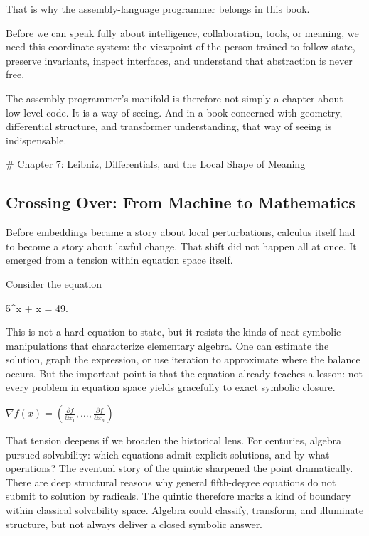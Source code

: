 \documentclass[
]{article}
\begin{document}
That is why the assembly-language programmer belongs in this book.

Before we can speak fully about intelligence, collaboration, tools, or
meaning, we need this coordinate system: the viewpoint of the person
trained to follow state, preserve invariants, inspect interfaces, and
understand that abstraction is never free.

The assembly programmer's manifold is therefore not simply a chapter
about low-level code. It is a way of seeing. And in a book concerned
with geometry, differential structure, and transformer understanding,
that way of seeing is indispensable.

\newpage
\vspace*{3cm}
\begin{center}
# Chapter 7: Leibniz, Differentials, and the Local Shape of Meaning
\end{center}

\hypertarget{crossing-over-from-machine-to-mathematics}{%
\subsection{Crossing Over: From Machine to
Mathematics}\label{crossing-over-from-machine-to-mathematics}}

Before embeddings became a story about local perturbations, calculus
itself had to become a story about lawful change. That shift did not
happen all at once. It emerged from a tension within equation space
itself.

Consider the equation

5\^{}x + x = 49.

This is not a hard equation to state, but it resists the kinds of neat
symbolic manipulations that characterize elementary algebra. One can
estimate the solution, graph the expression, or use iteration to
approximate where the balance occurs. But the important point is that
the equation already teaches a lesson: not every problem in equation
space yields gracefully to exact symbolic closure.

\(\nabla f(x)=\left(\frac{\partial f}{\partial x_1},\dots,\frac{\partial f}{\partial x_n}\right)\)

That tension deepens if we broaden the historical lens. For centuries,
algebra pursued solvability: which equations admit explicit solutions,
and by what operations? The eventual story of the quintic sharpened the
point dramatically. There are deep structural reasons why general
fifth-degree equations do not submit to solution by radicals. The
quintic therefore marks a kind of boundary within classical solvability
space. Algebra could classify, transform, and illuminate structure, but
not always deliver a closed symbolic answer.
\end{document}
